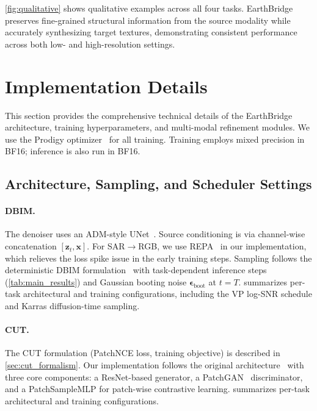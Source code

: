 \cref{fig:qualitative} shows qualitative examples across all four tasks. EarthBridge preserves fine-grained structural information from the source modality while accurately synthesizing target textures, demonstrating consistent performance across both low- and high-resolution settings.

\section{Implementation Details}
\label{sec:suppl_impl}

This section provides the comprehensive technical details of the EarthBridge architecture, training hyperparameters, and multi-modal refinement modules. We use the Prodigy optimizer~\cite{mishchenkoProdigyExpeditiouslyAdaptive2024} for all training. Training employs mixed precision in BF16; inference is also run in BF16.

\subsection{Architecture, Sampling, and Scheduler Settings}
\label{sec:suppl_architecture}

\paragraph{DBIM.}
The denoiser uses an ADM-style UNet~\cite{dhariwalDiffusionModelsBeat2021}. Source conditioning is via channel-wise concatenation $[\bm{z}_t, \bm{x}]$. For SAR$\rightarrow$RGB, we use REPA~\cite{yuRepresentationAlignmentGeneration2025} in our implementation, which relieves the loss spike issue in the early training steps. Sampling follows the deterministic DBIM formulation~\cite{zhengDiffusionBridgeImplicit2025} with task-dependent inference steps (\cref{tab:main_results}) and Gaussian booting noise $\bm{\epsilon}_{\text{boot}}$ at $t=T$.  summarizes per-task architectural and training configurations, including the VP log-SNR schedule and Karras diffusion-time sampling.

\paragraph{CUT.}
The CUT formulation (PatchNCE loss, training objective) is described in \cref{sec:cut_formalism}. Our implementation follows the original architecture~\cite{parkContrastiveLearningUnpaired2020} with three core components: a ResNet-based generator, a PatchGAN~\cite{isolaImageToImageTranslationConditional2017} discriminator, and a PatchSampleMLP for patch-wise contrastive learning.  summarizes per-task architectural and training configurations.

